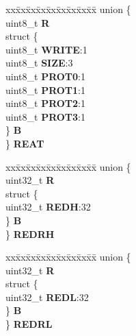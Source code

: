 \begin{DoxyCompactItemize}
\begin{tabbing}
\end{tabbing}\item 
\mbox{\label{structECSM__tag_ac2c7ef5cca9927fabf3f54875fe3c1d5}} 
\begin{tabbing}
xx\=xx\=xx\=xx\=xx\=xx\=xx\=xx\=xx\=\kill
union \{\\
\>uint8\_t {\bfseries R}\\
\>struct \{\\
\>\>uint8\_t {\bfseries WRITE}:1\\
\>\>uint8\_t {\bfseries SIZE}:3\\
\>\>uint8\_t {\bfseries PROT0}:1\\
\>\>uint8\_t {\bfseries PROT1}:1\\
\>\>uint8\_t {\bfseries PROT2}:1\\
\>\>uint8\_t {\bfseries PROT3}:1\\
\>\} {\bfseries B}\\
\} {\bfseries REAT}\\

\end{tabbing}\item 
\mbox{\label{structECSM__tag_acdf07e59901d48d0d6d253ea0e5492d7}} 
\begin{tabbing}
xx\=xx\=xx\=xx\=xx\=xx\=xx\=xx\=xx\=\kill
union \{\\
\>uint32\_t {\bfseries R}\\
\>struct \{\\
\>\>uint32\_t {\bfseries REDH}:32\\
\>\} {\bfseries B}\\
\} {\bfseries REDRH}\\

\end{tabbing}\item 
\mbox{\label{structECSM__tag_a9f9c18f718241cde7f2373da4fb7103c}} 
\begin{tabbing}
xx\=xx\=xx\=xx\=xx\=xx\=xx\=xx\=xx\=\kill
union \{\\
\>uint32\_t {\bfseries R}\\
\>struct \{\\
\>\>uint32\_t {\bfseries REDL}:32\\
\>\} {\bfseries B}\\
\} {\bfseries REDRL}\\


\end{tabbing}
\end{DoxyCompactItemize}
